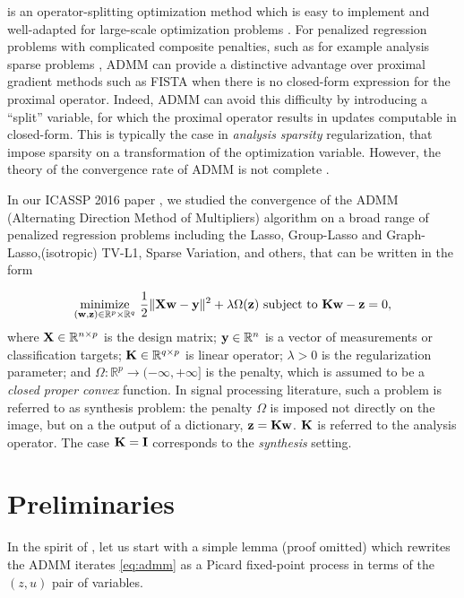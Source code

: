  \citep{glowinski1975approximation,gabay1976dual,eckstein1992douglas} is
an operator-splitting optimization method which is easy to implement and 
well-adapted for large-scale optimization problems
\citep{boyd2011distributed}. For penalized regression problems with
complicated composite penalties, such as for example analysis sparse
problems \citep{vaiter2013robust},  ADMM can provide a distinctive advantage
over proximal gradient methods such as FISTA \citep{beck09fista} 
when there is no closed-form expression for the 
proximal operator. Indeed, ADMM can
avoid this difficulty by introducing a ``split'' variable, for which the
proximal operator results in updates computable in closed-form.
This is typically the case in \emph{analysis sparsity} regularization,
that impose sparsity on a transformation of the optimization variable. 
However, the theory of the convergence rate of ADMM is
not complete \citep{boyd2011distributed}.

In our ICASSP 2016 paper  \citep{dohmatob2015local}, we studied the convergence of
the ADMM (Alternating Direction Method of Multipliers) algorithm on a broad range of penalized
regression problems including the Lasso, Group-Lasso and Graph-Lasso,(isotropic)
TV-L1, Sparse Variation, and others, that can be written in the form

\begin{equation}
  \underset{(\mathbf{w},\mathbf{z}) \in \mathbb{R}^p \times
    \mathbb{R}^q}{\text{minimize}}\text{ }\frac{1}{2}\|\mathbf{X}\mathbf{w}-\mathbf{y}\|^2 +
  \lambda\Omega(\mathbf{z}) \text{ subject to }\mathbf{K}\mathbf{w}
    - \mathbf{z} = 0,
  \label{eq:main_pb}
\end{equation}
where $\mathbf{X} \in \mathbb{R}^{n \times  p}$ is the design matrix; $\mathbf{y} \in
\mathbb{R}^n$ is a vector of measurements or classification targets; 
$\mathbf{K}\in\mathbb{R}^{q \times p}$ is linear operator;  $\lambda > 0$ is the
regularization parameter;
and $\Omega: \mathbb{R}^p \rightarrow (-\infty, +\infty]$ is
    the penalty, which is assumed to be a \textit{closed proper
      convex} function.
    In signal processing literature, such a problem is referred to as synthesis problem: the penalty $\Omega$ is imposed not directly on the image, but on a the output of a dictionary, $\mathbf{z} = \mathbf{K}\mathbf{w}$. $\mathbf{K}$ is referred to the analysis operator. The case $\mathbf{K} = \mathbf{I}$ corresponds to the \textit{synthesis} setting.


\section{Preliminaries}
In the spirit of \citep{ghadimi2013optimal},
let us start with a simple lemma (proof omitted) which
rewrites the ADMM iterates \eqref{eq:admm} as a Picard fixed-point
process in terms of the $(z, u)$ pair of variables.%

